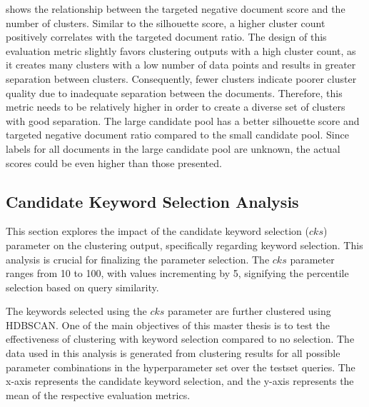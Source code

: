
 
 shows the relationship between the targeted negative document score and the number of clusters. Similar to the silhouette score, a higher cluster count positively correlates with the targeted document ratio. The design of this evaluation metric slightly favors clustering outputs with a high cluster count, as it creates many clusters with a low number of data points and results in greater separation between clusters. Consequently, fewer clusters indicate poorer cluster quality due to inadequate separation between the documents. Therefore, this metric needs to be relatively higher in order to create a diverse set of clusters with good separation. The large candidate pool has a better silhouette score and targeted negative document ratio compared to the small candidate pool. Since labels for all documents in the large candidate pool are unknown, the actual scores could be even higher than those presented.

\subsection{Candidate Keyword Selection Analysis}
This section explores the impact of the candidate keyword selection ($cks$) parameter on the clustering output, specifically regarding keyword selection. This analysis is crucial for finalizing the parameter selection. The $cks$ parameter ranges from 10 to 100, with values incrementing by 5, signifying the percentile selection based on query similarity. 

The keywords selected using the $cks$ parameter are further clustered using \ac{HDBSCAN}. One of the main objectives of this master thesis is to test the effectiveness of clustering with keyword selection compared to no selection. The data used in this analysis is generated from clustering results for all possible parameter combinations in the hyperparameter set over the testset queries. The x-axis represents the candidate keyword selection, and the y-axis represents the mean of the respective evaluation metrics.


